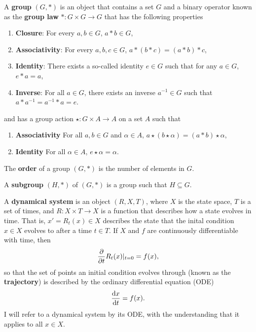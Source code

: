 \begin{define}
A {\bf group} $(G,\ast)$ is an object that contains a set $G$ and a binary operator known as the {\bf group law} $\ast: G \times G \to G$ that has the following properties 
\begin{enumerate}
\item {\bf Closure}: For every $a,b\in G$, $a \ast b \in G$,
\item {\bf Associativity}: For every $a,b,c \in G$, $a \ast (b\ast c) = (a\ast b)\ast c$,
\item {\bf Identity}: There exists a so-called identity $e \in G$ such that for any $a \in G$, $e\ast a = a$,
\item {\bf Inverse}: For all $a\in G$, there exists an inverse $a^{-1} \in G$ such that $a \ast a^{-1}=a^{-1}\ast a = e$.
\end{enumerate}
and has a group action $\star: G\times A \to A$ on a set $A$ such that 
\begin{enumerate}
\item {\bf Associativity} For all $a,b \in G$ and $\alpha \in A$, $a\star(b\star\alpha) =  (a \ast b)\star \alpha$,
\item {\bf Identity} For all $\alpha \in A$, $e \star \alpha = \alpha$.
\end{enumerate}
\end{define}
\clearpage
\begin{define}
The {\bf order} of a group $(G,\ast)$ is the number of elements in $G$. 
\end{define}
\begin{define}
A {\bf subgroup} $(H,\ast)$ of $(G,\ast)$ is a group such that $H \subseteq G$.  
\end{define}
\begin{define}
A {\bf dynamical system} is an object $(R,X,T)$, where $X$ is the state space, $T$ is a set of times, and $R: X \times T \rightarrow X$ is a function that describes how a state evolves in time. That is, $x' = R_t(x) \in X$ describes the state that the inital condition $x \in X$ evolves to after a time $t \in T$. If $X$ and $f$ are continuously differentiable with time, then
\begin{equation}
\pder{1}{}{t}R_t(x) |_{t=0} = f(x),
\end{equation} 
 so that the set of points an initial condition evolves through (known as the {\bf trajectory}) is described by the ordinary differential equation (ODE)
\begin{equation}
\der{1}{x}{t} = f(x).
\end{equation}
I will refer to a dynamical system by its ODE, with the understanding that it applies to all $x \in X$. 
\end{define}
